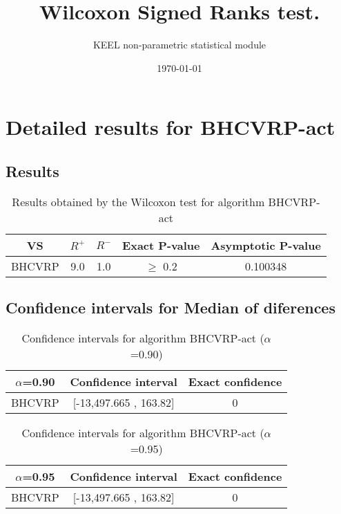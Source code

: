 \documentclass[a4paper,10pt]{article}
\title{Wilcoxon Signed Ranks test.}
\date{\today}
\author{KEEL non-parametric statistical module}
\begin{document}
\pagestyle{empty}
\maketitle
\thispagestyle{empty}



\section{Detailed results for BHCVRP-act}


\subsection{Results}

\begin{table}[!htp]
\centering\small
\begin{tabular}{
|c|c|c|c|c|}
\hline
 VS & $R^{+}$ & $R^{-}$ & Exact P-value & Asymptotic P-value \\ \hline 
BHCVRP & 9.0 & 1.0 & $\geq$ 0.2 & 0.100348\\ \hline 

\end{tabular}
\caption{Results obtained by the Wilcoxon test for algorithm BHCVRP-act}
\end{table}

\subsection{Confidence intervals for Median of diferences}

\begin{table}[!htp]
\centering\small
\begin{tabular}{
|c|c|c|}
\hline
 $\alpha$=0.90 & Confidence interval & Exact confidence \\ \hline 
BHCVRP & [-13,497.665 , 163.82] & 0\\ \hline 

\end{tabular}
\caption{Confidence intervals for algorithm BHCVRP-act ($\alpha$=0.90)}
\end{table}
\begin{table}[!htp]
\centering\small
\begin{tabular}{
|c|c|c|}
\hline
 $\alpha$=0.95 & Confidence interval & Exact confidence \\ \hline 
BHCVRP & [-13,497.665 , 163.82] & 0\\ \hline 

\end{tabular}
\caption{Confidence intervals for algorithm BHCVRP-act ($\alpha$=0.95)}
\end{table}
\end{document}
